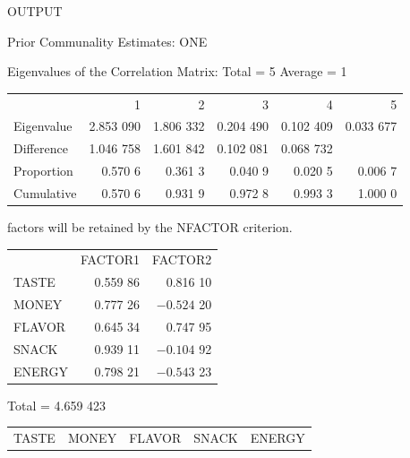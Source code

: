 
\begin{mvframe}[显示板 9.1(续)]
{\ttfamily\small
\noindent{}\hfill OUTPUT\par
\vspace{6pt}
{\centering Prior Communality Estimates: ONE\par\vspace{8pt}
Eigenvalues of the Correlation Matrix: Total = 5 Average = 1\par}
\vspace{6pt}
\begin{tabular}{l*{5}{r}}
& 1 & 2 & 3 & 4 & 5\\
Eigenvalue & 2.853 090 & 1.806 332 & 0.204 490 & 0.102 409 & 0.033 677\\
Difference & 1.046 758 & 1.601 842 & 0.102 081 & 0.068 732 & \\
Proportion & 0.570 6 & 0.361 3 & 0.040 9 & 0.020 5 & 0.006 7\\
Cumulative & 0.570 6 & 0.931 9 & 0.972 8 & 0.993 3 & 1.000 0\\
\end{tabular}
\par\vspace{10pt}
{ factors will be retained by the NFACTOR criterion.\par}
\vspace{10pt}
{\centering {}\par}
\vspace{8pt}
{\centering
\begin{tabular}{lrr}
& FACTOR1 & FACTOR2\\
TASTE & 0.559 86 & 0.816 10\\
MONEY & 0.777 26 & $-0.524$ 20\\
FLAVOR & 0.645 34 & 0.747 95\\
SNACK & 0.939 11 & $-0.104$ 92\\
ENERGY & 0.798 21 & $-0.543$ 23\\
\end{tabular}\par}
\vspace{10pt}
{\centering {}\quad Total = 4.659 423\par}
\vspace{8pt}
{\centering
\begin{tabular}{*{5}{r}}
TASTE & MONEY & FLAVOR & SNACK & ENERGY\\

\end{tabular}}}
\end{mvframe}
